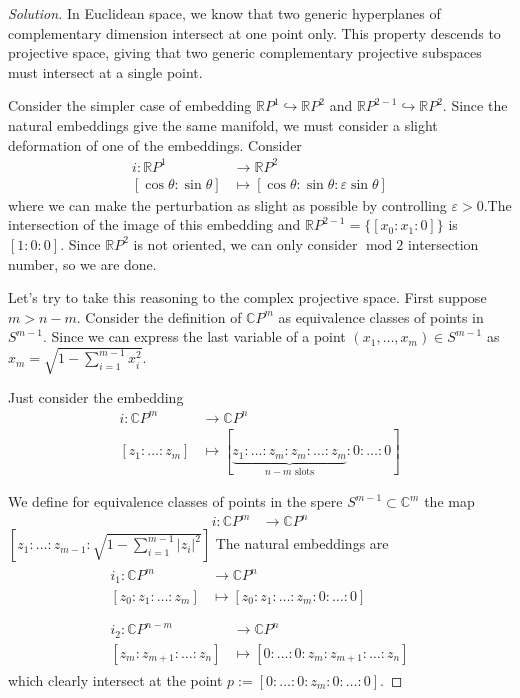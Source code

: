 \begin{proof}[Solution]
	In Euclidean space, we know that two generic hyperplanes of complementary dimension intersect at one point only. This property descends to projective space, giving that two generic complementary projective subspaces must intersect at a single point. 

	Consider the simpler case of embedding \(\mathbb{R}P^1 \hookrightarrow \mathbb{R}P^2\) and \(\mathbb{R}P^{2-1}\hookrightarrow \mathbb{R}P^2\). Since the natural embeddings give the same manifold, we must consider a slight deformation of one of the embeddings. Consider
\begin{align*}
	i: \mathbb{R}P^1 &\longrightarrow \mathbb{R}P^2 \\
	[\cos \theta: \sin \theta] &\longmapsto [\cos \theta:\sin \theta:\varepsilon\sin \theta]
\end{align*}
where we can make the perturbation as slight as possible by controlling \(\varepsilon>0\).The intersection of the image of this embedding and \(\mathbb{R}P^{2-1}=\{[x_0:x_1:0]\}\) is \([1:0:0]\). Since \(\mathbb{R}P^2\) is not oriented, we can only consider \(\operatorname{mod}2\) intersection number, so we are done.

Let's try to take this reasoning to the complex projective space. First suppose \(m>n-m\). Consider the definition of \(\mathbb{C}P^{m}\) as equivalence classes of points in  \(S^{m-1}\). Since we can express the last variable of a point \((x_1,\ldots,x_m)\in S^{m-1}\) as \(x_m=\sqrt{1-\sum_{i=1}^{m-1} x_i^2}\).

Just consider the embedding
\begin{align*}
	i: \mathbb{C}P^m &\longrightarrow \mathbb{C}P^n \\
	[z_1:\ldots:z_m] &\longmapsto [\underbrace{z_1:\ldots:z_m:z_m:\ldots:z_m}_{n-m \text{ slots} }:0:\ldots:0]
\end{align*}


We define for equivalence classes of points in the spere \(S^{m-1}\subset \mathbb{C}^m\) the map
\begin{align*}
	i: \mathbb{C}P^m &\longrightarrow \mathbb{C}P^n \end{align*}
\(\left[z_1:\ldots:z_{m-1}:\sqrt{1-\sum_{i=1}^{m-1}|z_i|^2}\right] \)
The natural embeddings are
\begin{align*}
\begin{aligned}i_1: \mathbb{C}P^m &\longrightarrow \mathbb{C}P^n \\
	[z_0:z_1:\ldots:z_m] &\longmapsto [z_0:z_1:\ldots:z_m:0:\ldots:0]
\end{aligned}
\\\\\begin{aligned}	i_2: \mathbb{C}P^{n-m} &\longrightarrow \mathbb{C}P^n \\
[z_{m}:z_{m+1}:\ldots:z_n] &\longmapsto [0:\ldots:0:z_{m}:z_{m+1}:\ldots:z_n] \end{aligned}\end{align*}
which clearly intersect at the point \(p:=[0:\ldots:0:z_m:0:\ldots:0]\).


\end{proof}
